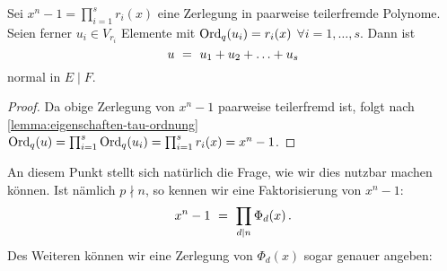 \begin{kor}
  Sei $x^n-1 = \prod_{i=1}^s r_i(x)$ eine Zerlegung in paarweise teilerfremde
  Polynome. Seien ferner $u_i \in V_{r_i}$ Elemente mit 
  $\operatorname{Ord}_q(u_i) = r_i(x)$ $\forall i=1,\ldots,s$. Dann ist
  \[ u \ =\  u_1 + u_2 + \ldots + u_s\]
  normal in $E \mid F$.
\end{kor}
\begin{proof}
  Da obige Zerlegung von $x^n-1$ paarweise teilerfremd ist, folgt nach
  \cref{lemma:eigenschaften-tau-ordnung}
  $\operatorname{Ord}_q(u) = \prod_{i=1}^s \operatorname{Ord}_q(u_i) = \prod_{i=1}^s r_i(x) = x^n -1$.
\end{proof}

\begin{beispiel}
  
\end{beispiel}


An diesem Punkt stellt sich natürlich die Frage, wie wir dies nutzbar machen
können. Ist nämlich $p\nmid n$, so kennen wir eine Faktorisierung von $x^n-1$:
\[ x^n-1 \ =\  \prod_{d\mid n} \Phi_d(x)\,.\]
Des Weiteren können wir eine Zerlegung von $\Phi_d(x)$ sogar genauer angeben:
